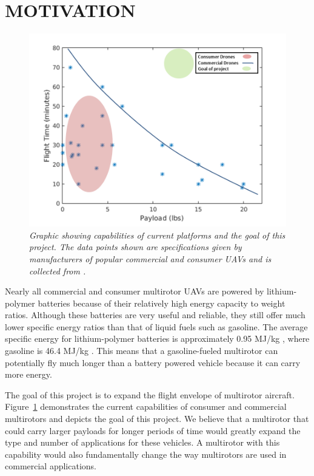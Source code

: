 \documentclass[letterpaper, 10 pt, conference]{ieeeconf}  %
\begin{document}
\section{MOTIVATION}

\begin{figure}
	\begin{center}
		\includegraphics[width=.5\textwidth]{current_capabilities.png}
		\caption{\textit{Graphic showing capabilities of current platforms and the goal of this project. The data points shown are specifications given by manufacturers of popular commercial and consumer UAVs and is collected from \cite{drones2016}.}} 
		\label{fig:current_cap}
	\end{center}
\end{figure}

Nearly all commercial and consumer multirotor UAVs are powered by lithium-polymer batteries because of their relatively high energy capacity to weight ratios. Although these batteries are very useful and reliable, they still offer much lower specific energy ratios than that of liquid fuels such as gasoline. The average specific energy for lithium-polymer batteries is approximately 0.95 MJ/kg \cite{Battuni2016}, where gasoline is 46.4 MJ/kg \cite{energyed2016}. This means that a gasoline-fueled multirotor can potentially fly much longer than a battery powered vehicle because it can carry more energy.

The goal of this project is to expand the flight envelope of multirotor aircraft.  Figure~\ref{fig:current_cap} demonstrates the current capabilities of consumer and commercial multirotors and depicts the goal of this project.  We believe that a multirotor that could carry larger payloads for longer periods of time would greatly expand the type and number of applications for these vehicles. A multirotor with this capability would also fundamentally change the way multirotors are used in commercial applications. 

\end{document}
